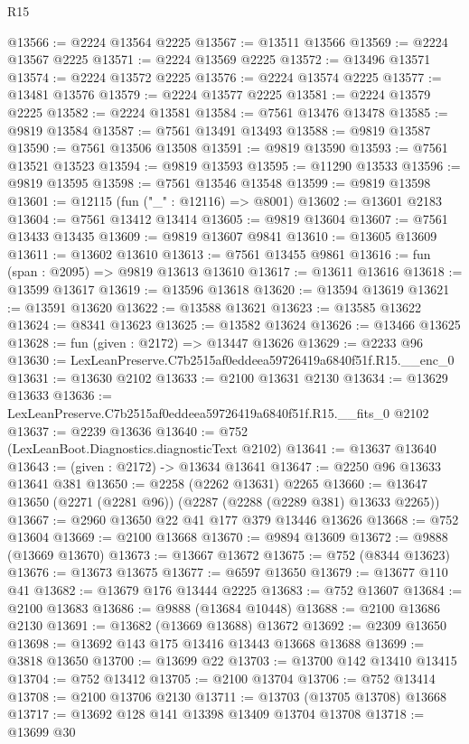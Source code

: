 \begin{lexlean}{R15}
\begin{coremodule}
@13566 := @2224 @13564 @2225
@13567 := @13511 @13566
@13569 := @2224 @13567 @2225
@13571 := @2224 @13569 @2225
@13572 := @13496 @13571
@13574 := @2224 @13572 @2225
@13576 := @2224 @13574 @2225
@13577 := @13481 @13576
@13579 := @2224 @13577 @2225
@13581 := @2224 @13579 @2225
@13582 := @2224 @13581
@13584 := @7561 @13476 @13478
@13585 := @9819 @13584
@13587 := @7561 @13491 @13493
@13588 := @9819 @13587
@13590 := @7561 @13506 @13508
@13591 := @9819 @13590
@13593 := @7561 @13521 @13523
@13594 := @9819 @13593
@13595 := @11290 @13533
@13596 := @9819 @13595
@13598 := @7561 @13546 @13548
@13599 := @9819 @13598
@13601 := @12115 (fun ("_" : @12116) => @8001)
@13602 := @13601 @2183
@13604 := @7561 @13412 @13414
@13605 := @9819 @13604
@13607 := @7561 @13433 @13435
@13609 := @9819 @13607 @9841
@13610 := @13605 @13609
@13611 := @13602 @13610
@13613 := @7561 @13455 @9861
@13616 := fun (span : @2095) => @9819 @13613 @13610
@13617 := @13611 @13616
@13618 := @13599 @13617
@13619 := @13596 @13618
@13620 := @13594 @13619
@13621 := @13591 @13620
@13622 := @13588 @13621
@13623 := @13585 @13622
@13624 := @8341 @13623
@13625 := @13582 @13624
@13626 := @13466 @13625
@13628 := fun (given : @2172) => @13447 @13626
@13629 := @2233 @96
@13630 := LexLeanPreserve.C7b2515af0eddeea59726419a6840f51f.R15.__enc_0
@13631 := @13630 @2102
@13633 := @2100 @13631 @2130
@13634 := @13629 @13633
@13636 := LexLeanPreserve.C7b2515af0eddeea59726419a6840f51f.R15.__fits_0 @2102
@13637 := @2239 @13636
@13640 := @752 (LexLeanBoot.Diagnostics.diagnosticText @2102)
@13641 := @13637 @13640
@13643 := (given : @2172) -> @13634 @13641
@13647 := @2250 @96 @13633 @13641 @381
@13650 := @2258 (@2262 @13631) @2265
@13660 := @13647 @13650 (@2271 (@2281 @96)) (@2287 (@2288 (@2289 @381) @13633 @2265))
@13667 := @2960 @13650 @22 @41 @177 @379 @13446 @13626
@13668 := @752 @13604
@13669 := @2100 @13668
@13670 := @9894 @13609
@13672 := @9888 (@13669 @13670)
@13673 := @13667 @13672
@13675 := @752 (@8344 @13623)
@13676 := @13673 @13675
@13677 := @6597 @13650
@13679 := @13677 @110 @41
@13682 := @13679 @176 @13444 @2225
@13683 := @752 @13607
@13684 := @2100 @13683
@13686 := @9888 (@13684 @10448)
@13688 := @2100 @13686 @2130
@13691 := @13682 (@13669 @13688) @13672
@13692 := @2309 @13650
@13698 := @13692 @143 @175 @13416 @13443 @13668 @13688
@13699 := @3818 @13650
@13700 := @13699 @22
@13703 := @13700 @142 @13410 @13415
@13704 := @752 @13412
@13705 := @2100 @13704
@13706 := @752 @13414
@13708 := @2100 @13706 @2130
@13711 := @13703 (@13705 @13708) @13668
@13717 := @13692 @128 @141 @13398 @13409 @13704 @13708
@13718 := @13699 @30

\end{coremodule}
\end{lexlean}
